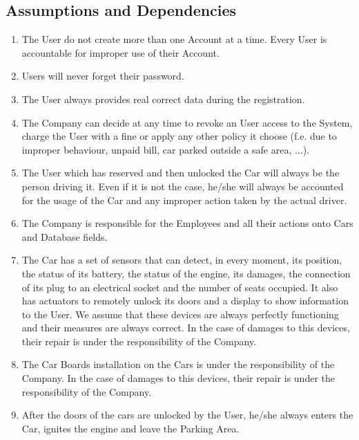\subsection{Assumptions and Dependencies}
\begin{enumerate}
	\item The User do not create more than one Account at a time. Every User is accountable for improper use of their Account.
	\item Users will never forget their password.
	\item The User always provides real correct data during the registration. 	
	\item The Company can decide at any time to revoke an User access to the System, charge the User with a fine or apply any other policy it choose (f.e. due to improper behaviour, unpaid bill, car parked outside a safe area, ...).
	\item The User which has reserved and then unlocked the Car will always be the person driving it. Even if it is not the case, he/she will always be accounted for the usage of the Car and any improper action taken by the actual driver. 
	\item The Company is responsible for the Employees and all their actions onto Cars and Database fields.
	\item The Car has a set of sensors that can detect, in every moment, its position, the status of its battery, the status of the engine, its damages, the connection of its plug to an electrical socket and the number of seats occupied. It also has actuators to remotely unlock its doors and a display to show information to the User. We assume that these devices are always perfectly functioning and their measures are always correct. In the case of damages to this devices, their repair is under the responsibility of the Company.
	\item The Car Boards installation on the Cars is under the responsibility of the Company. In the case of damages to this devices, their repair is under the responsibility of the Company.
	\item After the doors of the cars are unlocked by the User, he/she always enters the Car, ignites the engine and leave the Parking Area.

\end{enumerate}
